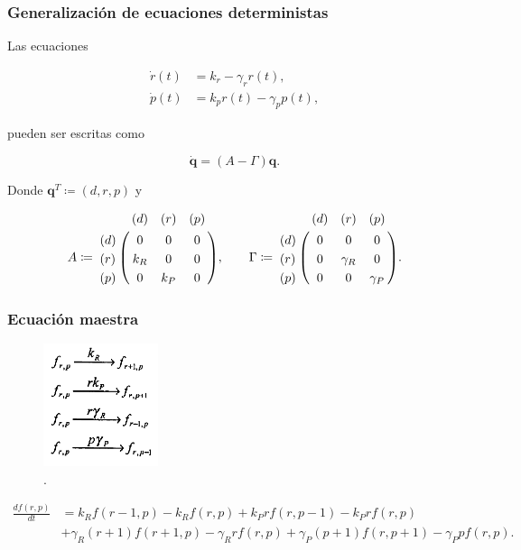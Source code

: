 \documentclass[10pt]{beamer}
\begin{document}
\begin{frame}
\frametitle{Generalizaci\'on de ecuaciones deterministas}

Las ecuaciones

\begin{align*}
\dot{r}(t) &= k_r - \gamma_rr(t),\\
\dot{p}(t) &= k_pr(t) - \gamma_pp(t),
\end{align*}

pueden ser escritas como

\begin{equation*}
\mathbf{\dot{q}} = (A - \Gamma)\mathbf{q}.
\end{equation*}

Donde $\mathbf{q}^T \coloneqq (d, r, p)$ y

\begin{align*}
A \coloneqq \bordermatrix{
  ~ & (d) & (r) & (p) \cr
  (d) & 0 & 0 & 0 \cr
  (r) & k_R & 0 & 0 \cr
  (p) & 0 & k_P & 0 \cr}, \quad \quad
\Gamma \coloneqq \bordermatrix{
  ~ & (d) & (r) & (p) \cr
  (d) & 0 & 0 & 0 \cr
  (r) & 0 & \gamma_R & 0 \cr
  (p) & 0 & 0 & \gamma_P \cr}.\\
\end{align*}
\end{frame}

\begin{frame}
\frametitle{Ecuaci\'on maestra}
\begin{figure}[p]
    \centering
    \includegraphics[width=0.3\textwidth]{scheme1.png}\\
    \tiny \cite{thattai01}.
\end{figure}
\begin{align*}
\frac{d{f}(r,p)}{dt} &= k_Rf(r-1,p) - k_Rf(r,p) + k_Prf(r,p-1) - k_Prf(r,p)\\
&+ \gamma_R(r+1)f(r+1,p) - \gamma_Rrf(r,p) + \gamma_P(p+1)f(r,p+1) - \gamma_Ppf(r,p).
\end{align*}
\end{frame}
\end{document}

